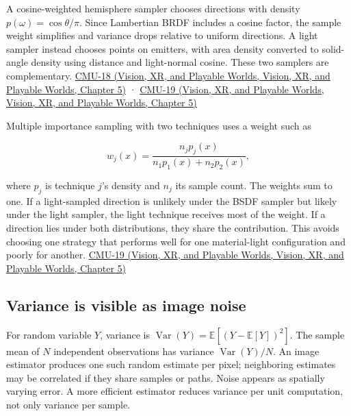 A cosine-weighted hemisphere sampler chooses directions with density \(p(\omega)=\cos\theta/\pi\). Since Lambertian BRDF includes a cosine factor, the sample weight simplifies and variance drops relative to uniform directions. A light sampler instead chooses points on emitters, with area density converted to solid-angle density using distance and light-normal cosine. These two samplers are complementary. \href{../07-Vision-XR-and-Playable-Worlds/main.pdf\#nameddest=04-visual-computing-ii-ch036-cmu-18---monte-carlo-rendering}{CMU-18 (Vision, XR, and Playable Worlds, Vision, XR, and Playable Worlds, Chapter 5)} · \href{../07-Vision-XR-and-Playable-Worlds/main.pdf\#nameddest=04-visual-computing-ii-ch036-cmu-19---variance-reduction}{CMU-19 (Vision, XR, and Playable Worlds, Vision, XR, and Playable Worlds, Chapter 5)}

Multiple importance sampling with two techniques uses a weight such as

\[
w_j(x)=\frac{n_jp_j(x)}{n_1p_1(x)+n_2p_2(x)},
\]

where \(p_j\) is technique \(j\)'s density and \(n_j\) its sample count. The weights sum to one. If a light-sampled direction is unlikely under the BSDF sampler but likely under the light sampler, the light technique receives most of the weight. If a direction lies under both distributions, they share the contribution. This avoids choosing one strategy that performs well for one material-light configuration and poorly for another. \href{../07-Vision-XR-and-Playable-Worlds/main.pdf\#nameddest=04-visual-computing-ii-ch036-cmu-19---variance-reduction}{CMU-19 (Vision, XR, and Playable Worlds, Vision, XR, and Playable Worlds, Chapter 5)}

\subsection{Variance is visible as image noise}\label{03-visual-computing-i-ch012-variance-is-visible-as-image-noise}

For random variable \(Y\), variance is \(\operatorname{Var}(Y)=\mathbb E[(Y-\mathbb E[Y])^2]\). The sample mean of \(N\) independent observations has variance \(\operatorname{Var}(Y)/N\). An image estimator produces one such random estimate per pixel; neighboring estimates may be correlated if they share samples or paths. Noise appears as spatially varying error. A more efficient estimator reduces variance per unit computation, not only variance per sample.

